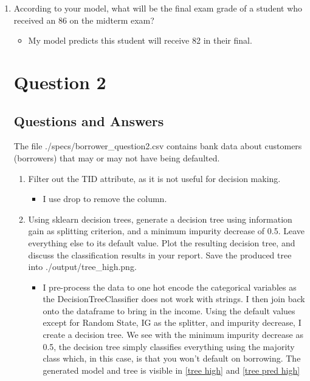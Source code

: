 \documentclass{scrreprt}
\begin{document}
\begin{enumerate}
\begin{enumerate}
		
	\end{enumerate}
	\item According to your model, what will be the final exam grade of a student who received an 86 on the midterm exam?
	\begin{itemize}
		\item My model predicts this student will receive 82 in their final.
	\end{itemize}
	
\newpage
\chapter{Question 2}
\section{Questions and Answers}
The file ./specs/borrower\_question2.csv contains bank data about customers (borrowers) that
may or may not have being defaulted.


\begin{enumerate}
	\item  Filter out the TID attribute, as it is not useful for decision making.
		\begin{itemize}
			\item I use drop to remove the column.
		\end{itemize}
	\item Using sklearn decision trees, generate a decision tree using information gain as splitting criterion, and a minimum impurity decrease of 0.5. Leave everything else to its default value. Plot the resulting decision tree, and discuss the classification results in your report. Save the produced tree into ./output/tree\_high.png.
		\begin{itemize}
		\item I pre-process the data to one hot encode the categorical variables as the DecisionTreeClassifier does not work with strings. I then join back onto the dataframe to bring in the income. Using the default values except for Random State, IG as the splitter, and impurity decrease, I create a decision tree. We see with the minimum impurity decrease as 0.5, the decision tree simply classifies everything using the majority class which, in this case, is that you won't default on borrowing. The generated model and tree is visible in \ref{tree high} and \ref{tree pred high}
		

\end{itemize}
\end{enumerate}
\end{enumerate}
\end{document}
